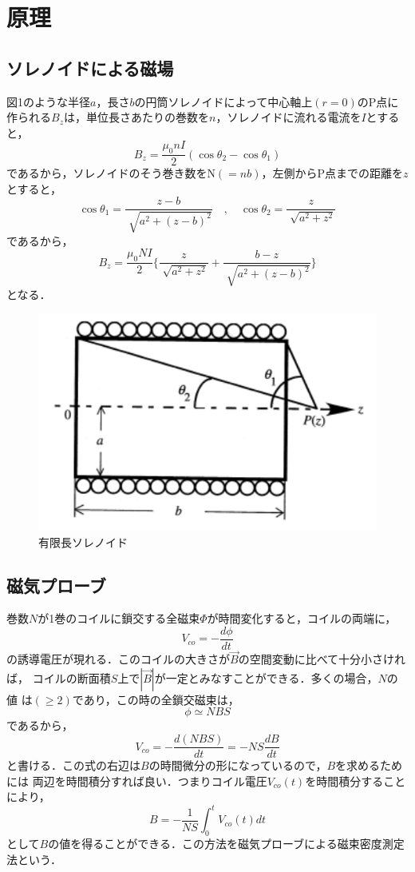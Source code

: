 
\section{原理}

\subsection{ソレノイドによる磁場}
図1のような半径$a$，長さ$b$の円筒ソレノイドによって中心軸上$(r = 0)$のP点に
作られる$B_z$は，単位長さあたりの巻数を$n$，ソレノイドに流れる電流を$I$とすると，
$$
B_z=\frac{\mu_0 n I}{2}(\cos \theta_2 - \cos \theta_1)
$$
であるから，ソレノイドのそう巻き数をN$(=nb)$，左側からP点までの距離を$z$とすると，
$$
\cos \theta_1 = \frac{z-b}{\sqrt[]{a^2+(z-b)^2}}\quad,\quad \cos \theta_2 = \frac{z}{\sqrt[]{a^2+z^2}}
$$
であるから，
$$
B_z=\frac{\mu_0 NI}{2} \{ \frac{z}{\sqrt[]{a^2+z^2}} + \frac{b-z}{\sqrt[]{a^2+(z-b)^2}} \}
$$
となる．
\begin{figure}[!ht]
    \centering
    \includegraphics[scale=1]{figure1.pdf}
    \caption{有限長ソレノイド}
\end{figure}

\newpage

\subsection{磁気プローブ}
巻数$N$が1巻のコイルに鎖交する全磁束$\Phi$が時間変化すると，コイルの両端に，
$$
V_{co}=-\frac{d\phi}{dt}
$$
の誘導電圧が現れる．このコイルの大きさが$\vec{B}$の空間変動に比べて十分小さければ，
コイルの断面積$S$上で$|\vec{B}|$が一定とみなすことができる．多くの場合，$N$の値
は$(\geq2)$であり，この時の全鎖交磁束は，
$$
\phi \simeq NBS
$$
であるから，
$$
V_{co}=- \frac{d(NBS)}{dt}=-NS\frac{dB}{dt}
$$
と書ける．この式の右辺は$B$の時間微分の形になっているので，$B$を求めるためには
両辺を時間積分すれば良い．つまりコイル電圧$V_{co}(t)$を時間積分することにより，
$$
B=-\frac{1}{NS} \int_{0}^{t} V_{co}(t)dt
$$
として$B$の値を得ることができる．この方法を磁気プローブによる磁束密度測定法という．

